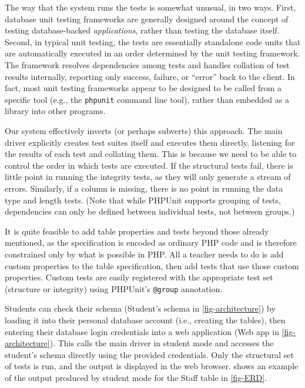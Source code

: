 \documentclass[sigconf, authordraft, capitalise]{acmart}
\begin{document}
The way that the system runs the tests is somewhat unusual, in two ways. First, database unit testing frameworks are generally designed around the concept of testing database-backed \emph{applications}, rather than testing the database itself. Second, in typical unit testing, the tests are essentially standalone code units that are automatically executed in an order determined by the unit testing framework. The framework resolves dependencies among tests and handles collation of test results internally, reporting only success, failure, or ``error'' back to the client. In fact, most unit testing frameworks appear to be designed to be called from a specific tool (e.g., the \texttt{phpunit} command line tool), rather than embedded as a library into other programs.

Our system effectively inverts (or perhaps subverts) this approach. The main driver explicitly creates test suites itself and executes them directly, listening for the results of each test and collating them. This is because we need to be able to control the order in which tests are executed. If the structural tests fail, there is little point in running the integrity tests, as they will only generate a stream of errors. Similarly, if a column is missing, there is no point in running the data type and length tests. (Note that while PHPUnit supports grouping of tests, dependencies can only be defined between individual tests, not between groups.)

It is quite feasible to add table properties and tests beyond those already mentioned, as the specification is encoded as ordinary PHP code and is therefore constrained only by what is possible in PHP. All a teacher needs to do is add custom properties to the table specification, then add tests that use those custom properties. Custom tests are easily registered with the appropriate test set (structure or integrity) using PHPUnit's \texttt{@group} annotation.

Students can check their schema (\textsf{Student's schema} in \cref{fig-architecture}) by loading it into their personal database account (i.e., creating the tables), then entering their database login credentials into a web application (\textsf{Web app} in \cref{fig-architecture}). This calls the main driver in student mode and accesses the student's schema directly using the provided credentials. Only the structural set of tests is run, and the output is displayed in the web browser.  shows an example of the output produced by student mode for the \textsf{Staff} table in \cref{fig-ERD}.
\end{document}

